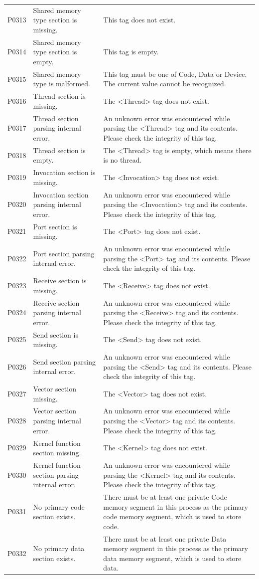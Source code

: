 \begin{xltabular}{\textwidth}{@{}>{\hsize\raggedright\arraybackslash}X>{\hsize\raggedright\arraybackslash}X>{\hsize\raggedright\arraybackslash}X@{}}
P0313 & Shared memory type section is missing. & This tag does not exist.\tabularnewline
P0314 & Shared memory type section is empty. & This tag is empty.\tabularnewline
P0315 & Shared memory type is malformed. & This tag must be one of Code, Data or Device. The current value cannot be recognized.\tabularnewline
P0316 & Thread section is missing. &
The <Thread> tag does not exist.\tabularnewline
P0317 & Thread section parsing internal error. &
An unknown error was encountered while parsing the <Thread> tag and its contents. Please check the integrity of this tag.\tabularnewline
P0318 & Thread section is empty. &
The <Thread> tag is empty, which means there is no thread.\tabularnewline
P0319 & Invocation section is missing. &
The <Invocation> tag does not exist.\tabularnewline
P0320 & Invocation section parsing internal error. &
An unknown error was encountered while parsing the <Invocation> tag and its contents. Please check the integrity of this tag.\tabularnewline
P0321 & Port section is missing. &
The <Port> tag does not exist.\tabularnewline
P0322 & Port section parsing internal error. &
An unknown error was encountered while parsing the <Port> tag and its contents. Please check the integrity of this tag.\tabularnewline
P0323 & Receive section is missing. &
The <Receive> tag does not exist.\tabularnewline
P0324 & Receive section parsing internal error. &
An unknown error was encountered while parsing the <Receive> tag and its contents. Please check the integrity of this tag.\tabularnewline
P0325 & Send section is missing. &
The <Send> tag does not exist.\tabularnewline
P0326 & Send section parsing internal error. &
An unknown error was encountered while parsing the <Send> tag and its contents. Please check the integrity of this tag.\tabularnewline
P0327 & Vector section missing. &
The <Vector> tag does not exist.\tabularnewline
P0328 & Vector section parsing internal error. &
An unknown error was encountered while parsing the <Vector> tag and its contents. Please check the integrity of this tag.\tabularnewline
P0329 & Kernel function section missing. &
The <Kernel> tag does not exist.\tabularnewline
P0330 & Kernel function section parsing internal error. &
An unknown error was encountered while parsing the <Kernel> tag and its contents. Please check the integrity of this tag.\tabularnewline
P0331 & No primary code section exists. &
There must be at least one private Code memory segment in this process as the primary code memory segment, which is used to store code.\tabularnewline
P0332 & No primary data section exists. &
There must be at least one private Data memory segment in this process as the primary data memory segment, which is used to store data.\tabularnewline

\end{xltabular}
